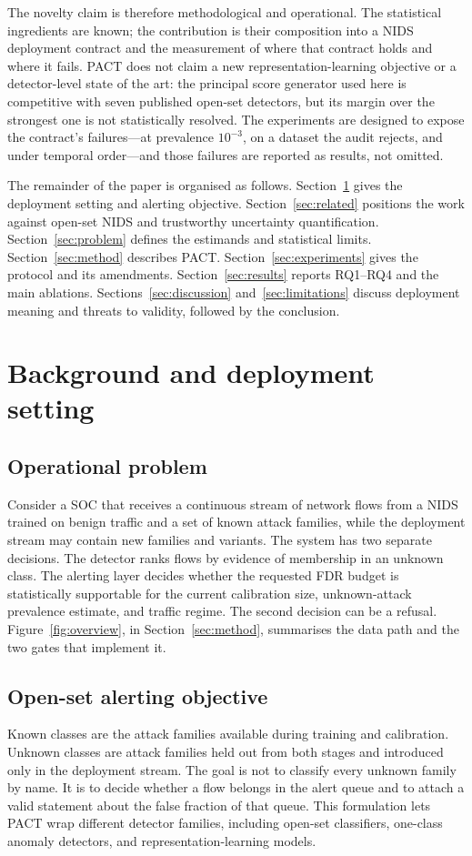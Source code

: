 \documentclass[a4paper,fleqn]{cas-dc}
\newcommand{\PACT}{PACT\xspace}
\begin{document}
The novelty claim is therefore methodological and operational. The statistical ingredients are known; the contribution is their composition into a NIDS deployment contract and the measurement of where that contract holds and where it fails. \PACT does not claim a new representation-learning objective or a detector-level state of the art: the principal score generator used here is competitive with seven published open-set detectors, but its margin over the strongest one is not statistically resolved. The experiments are designed to expose the contract's failures---at prevalence $10^{-3}$, on a dataset the audit rejects, and under temporal order---and those failures are reported as results, not omitted.

The remainder of the paper is organised as follows. Section~\ref{sec:background} gives the deployment setting and alerting objective. Section~\ref{sec:related} positions the work against open-set NIDS and trustworthy uncertainty quantification. Section~\ref{sec:problem} defines the estimands and statistical limits. Section~\ref{sec:method} describes \PACT. Section~\ref{sec:experiments} gives the protocol and its amendments. Section~\ref{sec:results} reports RQ1--RQ4 and the main ablations. Sections~\ref{sec:discussion} and~\ref{sec:limitations} discuss deployment meaning and threats to validity, followed by the conclusion.

\section{Background and deployment setting}
\label{sec:background}

\subsection{Operational problem}
Consider a SOC that receives a continuous stream of network flows from a NIDS trained on benign traffic and a set of known attack families, while the deployment stream may contain new families and variants. The system has two separate decisions. The detector ranks flows by evidence of membership in an unknown class. The alerting layer decides whether the requested FDR budget is statistically supportable for the current calibration size, unknown-attack prevalence estimate, and traffic regime. The second decision can be a refusal. Figure~\ref{fig:overview}, in Section~\ref{sec:method}, summarises the data path and the two gates that implement it.


\subsection{Open-set alerting objective}
Known classes are the attack families available during training and calibration. Unknown classes are attack families held out from both stages and introduced only in the deployment stream. The goal is not to classify every unknown family by name. It is to decide whether a flow belongs in the alert queue and to attach a valid statement about the false fraction of that queue. This formulation lets \PACT wrap different detector families, including open-set classifiers, one-class anomaly detectors, and representation-learning models.
\end{document}
